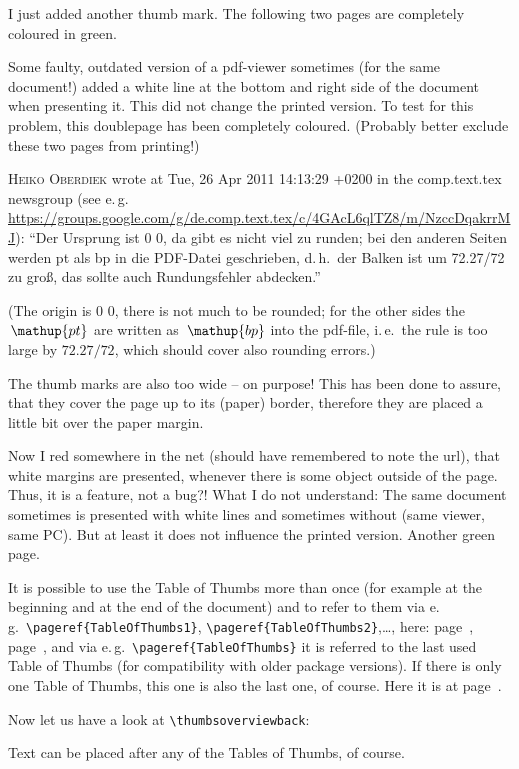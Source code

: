 \documentclass[a4paper,twoside,british]{article}[2025/01/22]%
\DeclareRobustCommand{\unit}[1]{\ensuremath{\mathord{\thinspace\mathup{#1}}}}
\begin{document}

I just added another thumb mark.
\newpage
The following two pages are completely coloured in green.
\newpage
\pagecolor{green}

\label{greenpage}

Some faulty, outdated version of a pdf-viewer sometimes (for the same document!)
added a white line at the bottom and right side of the document when presenting it. This did
not change the printed version. To test for this problem, this doublepage has been completely coloured.
(Probably better exclude these two pages from printing!)\newline

\textsc{Heiko Oberdiek} wrote at Tue, 26 Apr 2011 14:13:29 +0200 in the \newline
comp.text.tex newsgroup (see e.\,g.\newline
\url{https://groups.google.com/g/de.comp.text.tex/c/4GAcL6qlTZ8/m/NzccDqakrrMJ}):\newline
\textquotedblleft Der Ursprung ist 0 0, da gibt es nicht viel zu runden; bei den anderen
Seiten werden pt als bp in die PDF-Datei geschrieben, d.\,h.~der Balken ist um 72.27/72 zu
gro\ss{}, das sollte auch Rundungsfehler abdecken.\textquotedblright\newline

(The origin is 0 0, there is not much to be rounded; for the other sides the $\unit{pt}$
are written as $\unit{bp}$ into the pdf-file, i.\,e.~the rule is too large by $72.27/72$,
which should cover also rounding errors.)\newline

The thumb marks are also too wide -- on purpose! This has been done to assure,
that they cover the page up to its (paper) border, therefore they are placed
a little bit over the paper margin.\newline

Now I red somewhere in the net (should have remembered to note the url),
that white margins are presented, whenever there is some object outside of the page.
Thus, it is a feature, not a bug?!
What I do not understand: The same document sometimes is presented
with white lines and sometimes without (same viewer, same PC).\newline
But at least it does not influence the printed version.
\newpage
Another green page.
\newpage
\pagecolor{white}

It is possible to use the Table of Thumbs more than once (for example at the beginning and
at the end of the document) and to refer to them via e.\,g.~\verb|\pageref{TableOfThumbs1}|,\linebreak
\verb|\pageref{TableOfThumbs2}|,\ldots , here: page~\pageref{TableOfThumbs1},
page~\pageref{TableOfThumbs2}, and via e.\,g.~\verb|\pageref{TableOfThumbs}|
it is referred to the last used Table of Thumbs (for compatibility with older package versions).
If there is only one Table of Thumbs, this one is also the last one, of course.
Here it is at page~\pageref{TableOfThumbs}.\newline

Now let us have a look at \verb|\thumbsoverviewback|:

%
%
\newpage

Text can be placed after any of the Tables of Thumbs, of course.
\end{document}
